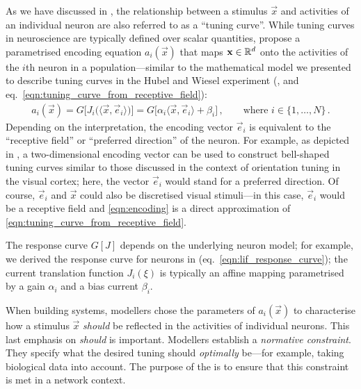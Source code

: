 As we have discussed in , the relationship between a stimulus $\vec x$ and activities of an individual neuron are also referred to as a \enquote{tuning curve}.
While tuning curves in neuroscience are typically defined over scalar quantities, \citeauthor{eliasmith2003neural} propose a parametrised encoding equation $a_i(\vec x)$ that maps $\mathbf{x} \in \mathbb{R}^{d}$ onto the activities of the $i$th neuron in a population---similar to the mathematical model we presented to describe tuning curves in the Hubel and Wiesel experiment (,   and eq.~\ref{eqn:tuning_curve_from_receptive_field}):
\begin{align}
a_i(\vec x) = G\big[J_i\big(\langle \vec x, \vec e_i \rangle\big)\big] = G\big[\alpha_i\langle \vec x, \vec e_i \rangle + \beta_i\big] \,,
 \quad\quad \text{where } i \in \{1, \ldots, N\} \,.\label{eqn:encoding}
\end{align}
Depending on the interpretation, the encoding vector $\vec e_i$ is equivalent to the \enquote{receptive field} or \enquote{preferred direction} of the neuron.
For example, as depicted in , a two-dimensional encoding vector can be used to construct bell-shaped tuning curves similar to those discussed in the context of orientation tuning in the visual cortex; here, the vector $\vec e_i$ would stand for a preferred direction.
Of course, $\vec e_i$ and $\vec x$ could also be discretised visual stimuli---in this case, $\vec e_i$ would be a receptive field and \cref{eqn:encoding} is a direct approximation of \cref{eqn:tuning_curve_from_receptive_field}.

The response curve $G[J]$ depends on the underlying neuron model; for example, we derived the response curve for \LIF neurons in  (eq.~\ref{eqn:lif_response_curve}); 
the current translation function $J_i(\xi)$ is typically an affine mapping parametrised by a gain $\alpha_i$ and a bias current $\beta_i$.

When building \NEF systems, modellers chose the parameters of $a_i(\vec x)$ to characterise how a stimulus $\vec x$ \emph{should} be reflected in the activities of individual neurons.
This last emphasis on \emph{should} is important.
Modellers establish a \emph{normative constraint}.
They specify what the desired tuning should \emph{optimally} be---for example, taking biological data into account.
The purpose of the \NEF is to ensure that this constraint is met in a network context.


